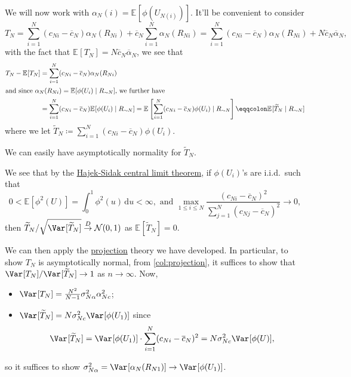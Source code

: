 We will now work with \(\alpha _N(i) = \mathbb{E}_{}[\phi (U_{N(i)})] \). It'll be convenient to consider
\[
	T_N
	= \sum_{i=1}^{N} (c_{Ni} - \overline{c} _N) \alpha _N(R_{Ni}) + \overline{c} _N \sum_{i=1}^{N} \alpha _N(R_{Ni})
	= \sum_{i=1}^{N} (c_{Ni} - \overline{c} _N) \alpha _N(R_{Ni}) + N \overline{c} _N \overline{\alpha} _N,
\]
with the fact that \(\mathbb{E}_{}[T_N] = N \overline{c} _N \overline{\alpha} _N\), we see that
\begin{align*}
	T_N - \mathbb{E}_{}[T_N]
	 & = \sum_{i=1}^{N} (c_{Ni} - \overline{c} _N) \alpha _N(R_{Ni})                         \\
	\shortintertext{and since \(\alpha _N(R_{Ni}) = \mathbb{E}_{}[\phi (U_i) \mid R_{\sim N}]\), we further have}
	 & = \sum_{i=1}^{N} (c_{Ni} - \overline{c} _N) \mathbb{E}_{}[\phi (U_i) \mid R_{\sim N}]
	= \mathbb{E}_{}\left[\sum_{i=1}^{N} (c_{Ni} - \overline{c} _N) \phi (U_i) \mid R_{\sim N}\right]
	\eqqcolon \mathbb{E}_{}[\widetilde{T} _N \mid R_{\sim N}]
\end{align*}
where we let \(\widetilde{T} _N \coloneqq \sum_{i=1}^{N} (c_{Ni} - \overline{c} _N) \phi (U_i)\).

\begin{remark}
	We can easily have asymptotically normality for \(\widetilde{T} _N\).
\end{remark}
\begin{explanation}
	We see that by the \hyperref[thm:Hajek-Sidak-CLT]{Hajek-Sidak central limit theorem}, if \(\phi (U_i)\)'s are i.i.d.\ such that
	\[
		0 < \mathbb{E}_{}[\phi ^2(U)] = \int_{0}^{1} \phi ^2(u) \,\mathrm{d}u < \infty, \text{ and }
		\max _{1 \leq i \leq N} \frac{(c_{Ni} - \overline{c} _N)^2}{\sum_{j=1}^{N} (c_{Nj} - \overline{c} _N)^2} \to 0,
	\]
	then \(\widetilde{T} _N / \sqrt{\Var_{}[\widetilde{T} _N] } \overset{D}{\to} \mathcal{N} (0, 1)\) as \(\mathbb{E}_{}[\widetilde{T} _N] = 0 \).
\end{explanation}

We can then apply the \hyperref[def:projection]{projection} theory we have developed. In particular, to show \(T_N\) is asymptotically normal, from \autoref{col:projection}, it suffices to show that \(\Var_{}[T_N] / \Var_{}[\widetilde{T} _N] \to 1\) as \(n \to \infty \). Now,
\begin{itemize}
	\item \(\Var_{}[T_N] = \frac{N^2}{N-1} \sigma _{N \alpha }^2 \alpha _{Nc}^2\);
	\item \(\Var_{}[\widetilde{T} _N] = N \sigma _{Nc}^2 \Var_{}[\phi (U_1)] \) since
	      \[
		      \Var_{}[\widetilde{T} _N]
		      = \Var_{}[\phi (U_1)] \cdot \sum_{i=1}^{N} (c_{Ni} - \overline{c} _N)^2
		      = N \sigma _{Nc}^2 \Var_{}[\phi (U)] ,
	      \]
\end{itemize}
so it suffices to show \(\sigma _{N \alpha }^2 = \Var_{}[\alpha _N(R_{N1})] \to \Var_{}[\phi (U_1)] \).

